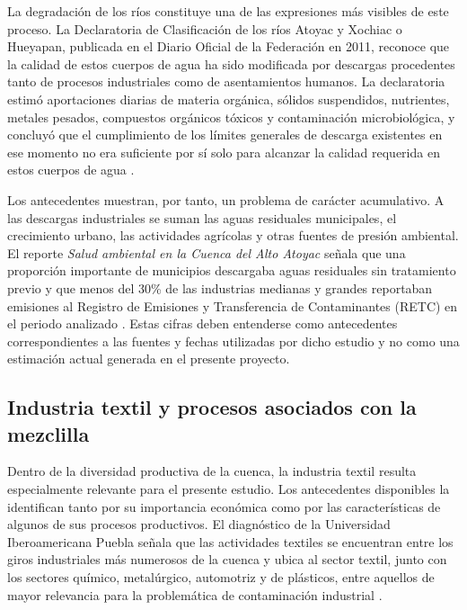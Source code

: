 \documentclass[11pt,letterpaper]{article}
\begin{document}
La degradación de los ríos constituye una de las expresiones más visibles de este proceso. La Declaratoria de Clasificación de los ríos Atoyac y Xochiac o Hueyapan, publicada en el Diario Oficial de la Federación en 2011, reconoce que la calidad de estos cuerpos de agua ha sido modificada por descargas procedentes tanto de procesos industriales como de asentamientos humanos. La declaratoria estimó aportaciones diarias de materia orgánica, sólidos suspendidos, nutrientes, metales pesados, compuestos orgánicos tóxicos y contaminación microbiológica, y concluyó que el cumplimiento de los límites generales de descarga existentes en ese momento no era suficiente por sí solo para alcanzar la calidad requerida en estos cuerpos de agua \cite{dof2011atoyac}.

Los antecedentes muestran, por tanto, un problema de carácter acumulativo. A las descargas industriales se suman las aguas residuales municipales, el crecimiento urbano, las actividades agrícolas y otras fuentes de presión ambiental. El reporte \textit{Salud ambiental en la Cuenca del Alto Atoyac} señala que una proporción importante de municipios descargaba aguas residuales sin tratamiento previo y que menos del 30\% de las industrias medianas y grandes reportaban emisiones al Registro de Emisiones y Transferencia de Contaminantes (RETC) en el periodo analizado \cite{perezcastresana2023}. Estas cifras deben entenderse como antecedentes correspondientes a las fuentes y fechas utilizadas por dicho estudio y no como una estimación actual generada en el presente proyecto.

\subsection{Industria textil y procesos asociados con la mezclilla}

Dentro de la diversidad productiva de la cuenca, la industria textil resulta especialmente relevante para el presente estudio. Los antecedentes disponibles la identifican tanto por su importancia económica como por las características de algunos de sus procesos productivos. El diagnóstico de la Universidad Iberoamericana Puebla señala que las actividades textiles se encuentran entre los giros industriales más numerosos de la cuenca y ubica al sector textil, junto con los sectores químico, metalúrgico, automotriz y de plásticos, entre aquellos de mayor relevancia para la problemática de contaminación industrial \cite{perezcastresana2023}.
\end{document}
